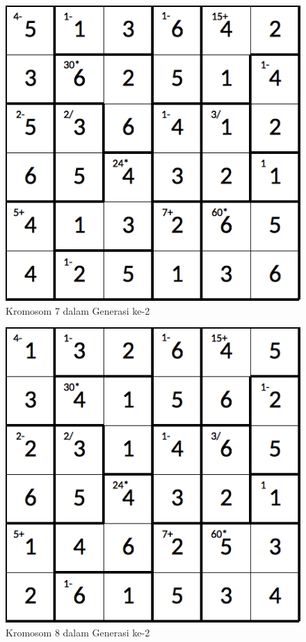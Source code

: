 \begin{figure}
\centering
\captionsetup{justification=centering}
\includegraphics[scale=0.333]{Gambar/hybridgenetic/Generation2Chromosome7}
\caption[Kromosom 7 dalam Generasi ke-2]{Kromosom 7 dalam Generasi ke-2}
\label{fig:analisisg2k7}
\end{figure}

\begin{figure}
\centering
\captionsetup{justification=centering}
\includegraphics[scale=0.333]{Gambar/hybridgenetic/Generation2Chromosome8}
\caption[Kromosom 8 dalam Generasi ke-2]{Kromosom 8 dalam Generasi ke-2}
\label{fig:analisisg2k8}
\end{figure}

